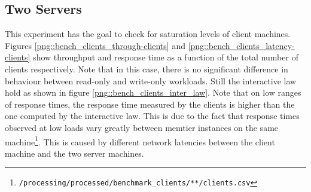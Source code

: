 \documentclass[11pt,a4paper]{article}
\begin{document}
\subsection{Two Servers}
This experiment has the goal to check for saturation levels of client machines. Figures \ref{png::bench_clients_through-clients} and \ref{png::bench_clients_latency-clients} show throughput and response time as a function of the total number of clients respectively. Note that in this case, there is no significant difference in behaviour between read-only and write-only workloads. Still the interactive law hold as shown in figure \ref{png::bench_clients_inter_law}. Note that on low ranges of response times, the response time measured by the clients is higher than the one computed by the interactive law. This is due to the fact that response times observed at low loads vary greatly between memtier instances on the same machine\footnote{\texttt{/processing/processed/benchmark_clients/**/clients.csv}}. This is caused by different network latencies between the client machine and the two server machines.
\end{document}
